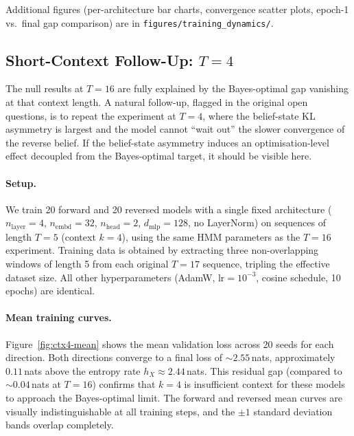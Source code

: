 \documentclass[11pt]{article}
\newcommand{\claude}[1]{{\color{red}\textsf{#1}}}
\begin{document}
Additional figures (per-architecture bar charts, convergence scatter plots, epoch-1 vs.\ final gap comparison) are in \texttt{figures/training\_dynamics/}.

\subsection{Short-Context Follow-Up: $T = 4$}\label{sec:ctx4}

\claude{The null results at $T = 16$ are fully explained by the Bayes-optimal gap vanishing at that context length.  A natural follow-up, flagged in the original open questions, is to repeat the experiment at $T = 4$, where the belief-state KL asymmetry is largest and the model cannot ``wait out'' the slower convergence of the reverse belief.  If the belief-state asymmetry induces an optimisation-level effect decoupled from the Bayes-optimal target, it should be visible here.}

\paragraph{Setup.}
\claude{We train 20 forward and 20 reversed models with a single fixed architecture ($n_{\mathrm{layer}} = 4$, $n_{\mathrm{embd}} = 32$, $n_{\mathrm{head}} = 2$, $d_{\mathrm{mlp}} = 128$, no LayerNorm) on sequences of length $T = 5$ (context $k = 4$), using the same HMM parameters as the $T = 16$ experiment.  Training data is obtained by extracting three non-overlapping windows of length 5 from each original $T = 17$ sequence, tripling the effective dataset size.  All other hyperparameters (AdamW, $\mathrm{lr} = 10^{-3}$, cosine schedule, 10 epochs) are identical.}

\paragraph{Mean training curves.}
\claude{Figure~\ref{fig:ctx4-mean} shows the mean validation loss across 20 seeds for each direction.  Both directions converge to a final loss of $\sim 2.55$\,nats, approximately $0.11$\,nats above the entropy rate $h_X \approx 2.44$\,nats.  This residual gap (compared to $\sim 0.04$\,nats at $T = 16$) confirms that $k = 4$ is insufficient context for these models to approach the Bayes-optimal limit.  The forward and reversed mean curves are visually indistinguishable at all training steps, and the $\pm 1$ standard deviation bands overlap completely.}
\end{document}
